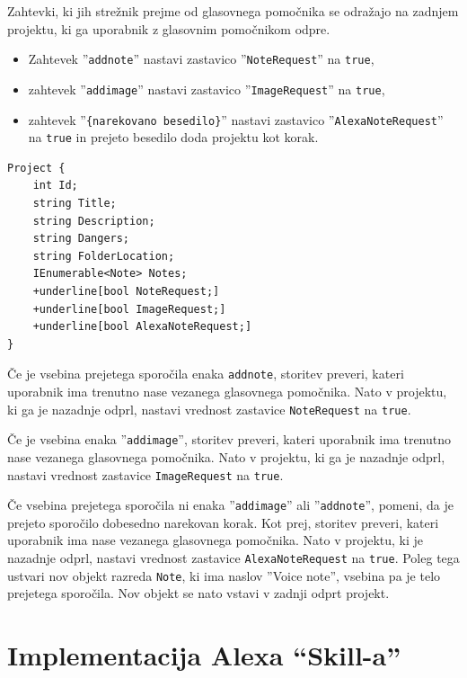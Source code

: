 \documentclass[a4paper, 12pt]{book}
\begin{document}
Zahtevki, ki jih strežnik prejme od glasovnega pomočnika se odražajo na zadnjem projektu, ki ga uporabnik z glasovnim pomočnikom odpre.
\begin{itemize}
	\item Zahtevek ''\texttt{addnote}'' nastavi zastavico ''\texttt{NoteRequest}'' na \texttt{true},
	\item zahtevek ''\texttt{addimage}'' nastavi zastavico ''\texttt{ImageRequest}'' na \texttt{true},
	\item zahtevek ''\texttt{\{narekovano besedilo\}}'' nastavi zastavico ''\texttt{AlexaNoteRequest}'' na \texttt{true} in prejeto besedilo doda projektu kot korak.
\end{itemize}

\begin{Verbatim}[commandchars=+\[\]]
Project { 
    int Id; 
    string Title; 
    string Description; 
    string Dangers; 
    string FolderLocation; 
    IEnumerable<Note> Notes; 
    +underline[bool NoteRequest;] 
    +underline[bool ImageRequest;] 
    +underline[bool AlexaNoteRequest;] 
}
\end{Verbatim}


Če je vsebina prejetega sporočila enaka \texttt{addnote}, storitev preveri, kateri uporabnik ima trenutno nase vezanega glasovnega pomočnika.
Nato v projektu, ki ga je nazadnje odprl, nastavi vrednost zastavice \texttt{NoteRequest} na \texttt{true}.


Če je vsebina enaka ''\texttt{addimage}'', storitev preveri, kateri uporabnik ima trenutno nase vezanega glasovnega pomočnika.
Nato v projektu, ki ga je nazadnje odprl, nastavi vrednost zastavice \texttt{ImageRequest} na \texttt{true}.

Če vsebina prejetega sporočila ni enaka ''\texttt{addimage}'' ali ''\texttt{addnote}'', pomeni, da je prejeto sporočilo dobesedno narekovan korak.
Kot prej, storitev preveri, kateri uporabnik ima nase vezanega glasovnega pomočnika.
Nato v projektu, ki je nazadnje odprl, nastavi vrednost zastavice \texttt{AlexaNoteRequest} na \texttt{true}.
Poleg tega ustvari nov objekt razreda \texttt{Note}, ki ima naslov ''Voice note'', vsebina pa je telo prejetega sporočila.
Nov objekt se nato vstavi v zadnji odprt projekt.



\section{Implementacija Alexa \enquote{Skill-a}}
\end{document}
